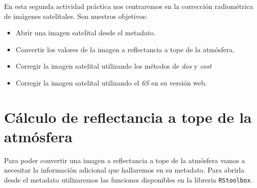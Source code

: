 
En esta segunda actividad pr\'actica nos centraremos en la correcci\'on radiom\'etrica
de im\'agenes satelitales. Son nuestros objetivos:

\begin{itemize}
    \item Abrir una imagen satelital desde el metadato.
    \item Convertir los valores de la imagen a reflectancia a tope de la
        atm\'osfera.
    \item Corregir la imagen satelital utilizando los m\'etodos de \emph{dos} y
        \emph{cost}
    \item Corregir la imagen satelital utilizando el \emph{6S} en su versi\'on web.
\end{itemize}

\section{C\'alculo de reflectancia a tope de la atm\'osfera}

Para poder convertir una imagen a reflectancia a tope de la atm\'osfera vamos a
necesitar la informaci\'on adicional que hallaremos en su metadato.
Para abrirla desde el metadato utilizaremos las funciones
disponibles en la libreria \texttt{RStoolbox}.

